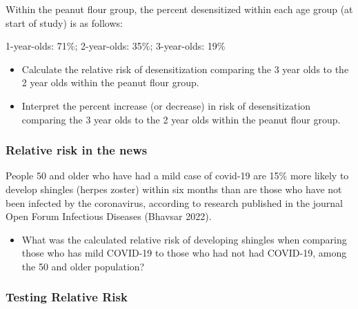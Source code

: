 \documentclass[
]{report}
\providecommand{\tightlist}{%
  \setlength{\itemsep}{0pt}\setlength{\parskip}{0pt}}
\begin{document}
\vspace{1in}

Within the peanut flour group, the percent desensitized within each age group (at start of study) is as follows:

1-year-olds: 71\%; 2-year-olds: 35\%; 3-year-olds: 19\%

\begin{itemize}
\tightlist
\item
  Calculate the relative risk of desensitization comparing the 3 year olds to the 2 year olds within the peanut flour group.
\end{itemize}

\vspace{0.8in}

\begin{itemize}
\tightlist
\item
  Interpret the percent increase (or decrease) in risk of desensitization comparing the 3 year olds to the 2 year olds within the peanut flour group.
\end{itemize}

\vspace{0.8in}

\hypertarget{relative-risk-in-the-news}{%
\subsubsection*{Relative risk in the news}\label{relative-risk-in-the-news}}

People 50 and older who have had a mild case of covid-19 are 15\% more likely to develop shingles (herpes zoster) within six months than are those who have not been infected by the coronavirus, according to research published in the journal Open Forum Infectious Diseases (Bhavsar 2022).

\begin{itemize}
\tightlist
\item
  What was the calculated relative risk of developing shingles when comparing those who has mild COVID-19 to those who had not had COVID-19, among the 50 and older population?
\end{itemize}

\vspace{0.8in}

\hypertarget{testing-relative-risk}{%
\subsubsection*{Testing Relative Risk}\label{testing-relative-risk}}
\end{document}
